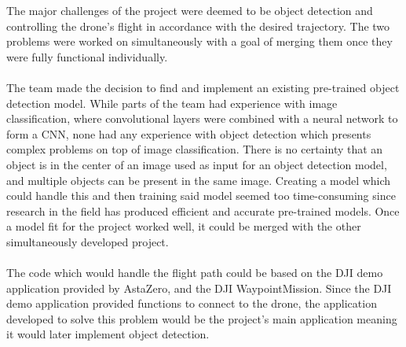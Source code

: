 The major challenges of the project were deemed to be object detection and controlling the drone's flight in accordance with the desired trajectory. The two problems were worked on simultaneously with a goal of merging them once they were fully functional individually. 
\\ \\
The team made the decision to find and implement an existing pre-trained object detection model. While parts of the team had experience with image classification, where convolutional layers were combined with a neural network to form a CNN, none had any experience with object detection which presents complex problems on top of image classification. There is no certainty that an object is in the center of an image used as input for an object detection model, and multiple objects can be present in the same image. Creating a model which could handle this and then training said model seemed too time-consuming since research in the field has produced efficient and accurate pre-trained models. Once a model fit for the project worked well, it could be merged with the other simultaneously developed project.
\\ \\
The code which would handle the flight path could be based on the DJI demo application provided by AstaZero, and the DJI WaypointMission. Since the DJI demo application provided functions to connect to the drone, the application developed to solve this problem would be the project's main application meaning it would later implement object detection. 

